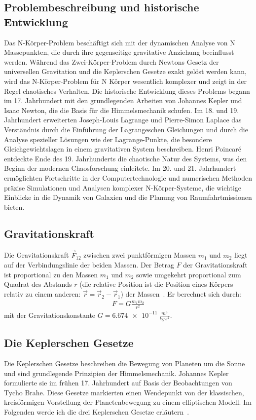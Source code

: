 \documentclass[a4paper,12pt,twoside]{article}
\begin{document}
\subsection{Problembeschreibung und historische Entwicklung}
Das N-Körper-Problem beschäftigt sich mit der dynamischen Analyse von N Massepunkten, die durch ihre gegenseitige gravitative Anziehung beeinflusst werden. Während das Zwei-Körper-Problem durch Newtons Gesetz der universellen Gravitation und die Keplerschen Gesetze exakt gelöst werden kann, wird das N-Körper-Problem für N Körper wesentlich komplexer und zeigt in der Regel chaotisches Verhalten. Die historische Entwicklung dieses Problems begann im 17. Jahrhundert mit den grundlegenden Arbeiten von Johannes Kepler und Isaac Newton, die die Basis für die Himmelsmechanik schufen. Im 18. und 19. Jahrhundert erweiterten Joseph-Louis Lagrange und Pierre-Simon Laplace das Verständnis durch die Einführung der Lagrangeschen Gleichungen und durch die Analyse spezieller Lösungen wie der Lagrange-Punkte, die besondere Gleichgewichtslagen in einem gravitativen System beschreiben. Henri Poincaré entdeckte Ende des 19. Jahrhunderts die chaotische Natur des Systems, was den Beginn der modernen Chaosforschung einleitete. Im 20. und 21. Jahrhundert ermöglichten Fortschritte in der Computertechnologie und numerischen Methoden präzise Simulationen und Analysen komplexer N-Körper-Systeme, die wichtige Einblicke in die Dynamik von Galaxien und die Planung von Raumfahrtmissionen bieten.

\subsection{Gravitationskraft}
Die Gravitationskraft $\vec{F}_{12}$ zwischen zwei punktförmigen Massen $m_1$ und $m_2$ liegt auf der Verbindungslinie der beiden Massen.
Der Betrag $F$ der Gravitationskraft ist proportional zu den Massen $m_1$ und $m_2$ sowie umgekehrt proportional zum Quadrat des Abstands $r$ 
(die relative Position ist die Position eines Körpers relativ zu einem anderen: \(\vec{r} = \vec{r}_2 - \vec{r}_1\)) der Massen~\cite{LeifiPhysikGravitation}. Er berechnet sich durch:
\begin{align*}
	F = G \frac{m_1 m_2}{r^2}
\end{align*}
mit der Gravitationskonstante $G = \SI{6.674e-11}{\frac{m^3}{kg\,s^2}}$.

\subsection{Die Keplerschen Gesetze}
Die Keplerschen Gesetze beschreiben die Bewegung von Planeten um die Sonne und sind grundlegende Prinzipien der Himmelsmechanik. Johannes Kepler formulierte sie im frühen 17. Jahrhundert auf Basis der Beobachtungen von Tycho Brahe. Diese Gesetze markierten einen Wendepunkt von der klassischen, kreisförmigen Vorstellung der Planetenbewegung zu einem elliptischen Modell. Im Folgenden werde ich die drei Keplerschen Gesetze erläutern~\cite{LeifiPhysikKepler}.
\end{document}

